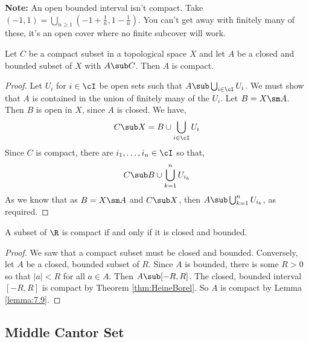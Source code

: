 \noindent
\textbf{Note:} An open bounded interval isn't compact. Take $(-1, 1) = \bigcup_{n \ge 1} \left( -1 + \frac{1}{n}, 1 - \frac{1}{n} \right)$. You can't get away with finitely many of these, it's an open cover where no finite subcover will work.

\begin{nlemma}[]
  Let $C$ be a compact subset in a topological space $X$ and let $A$ be a closed and bounded subset of $X$ with $A\sub C$. Then $A$ is compact.\label{lemma:7.9}
\end{nlemma}
\begin{proof}
  Let $U_i$ for $i \in \cI$ be open sets such that $A\sub \bigcup_{i \in \cI} U_i$. We must show that $A$ is contained in the union of finitely many of the $U_i$. Let $B = X\sm A$. Then $B$ is open in $X$, since $A$ is closed. We have,
  $$ C \sub X = B \cup \bigcup_{i \in \cI} U_i $$
  Since $C$ is compact, there are $i_1, \dots, i_n \in \cI$ so that,
  $$ C \sub B \cup \bigcup_{k=1}^n U_{i_k} $$
  As we know that as $B = X\sm A$ and $C \sub X$, then $A \sub \bigcup_{k=1}^n U_{i_k}$, as required.
\end{proof}

\begin{ncor}
   A subset of $\R$ is compact if and only if it is closed and bounded.
\end{ncor}
\begin{proof}
  We saw that a compact subset must be closed and bounded. Conversely, let $A$ be a closed, bounded subset of $R$. Since $A$ is bounded, there is some $R > 0$ so that $|a| < R$ for all $a \in A$. Then $A \sub [-R, R]$. The closed, bounded interval $[-R, R]$ is compact by Theorem \ref{thm:HeineBorel}. So $A$ is compact by Lemma \ref{lemma:7.9}.
\end{proof}

\subsection{Middle Cantor Set}

